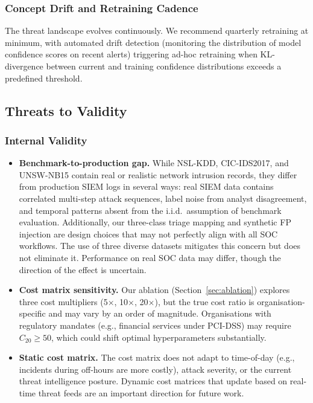 \documentclass[conference]{IEEEtran}
\begin{document}
\subsubsection{Concept Drift and Retraining Cadence}
The threat landscape evolves continuously.
We recommend quarterly retraining at minimum, with automated drift detection
(monitoring the distribution of model confidence scores on recent alerts) triggering
ad-hoc retraining when KL-divergence between current and training confidence distributions
exceeds a predefined threshold.

\subsection{Threats to Validity}
\label{sec:threats}

\subsubsection{Internal Validity}
\begin{itemize}
  \item \textbf{Benchmark-to-production gap.}
    While NSL-KDD, CIC-IDS2017, and UNSW-NB15 contain real or realistic network
    intrusion records, they differ from production SIEM logs in several ways:
    real SIEM data contains correlated multi-step attack sequences, label noise
    from analyst disagreement, and temporal patterns absent from the i.i.d.\
    assumption of benchmark evaluation.
    Additionally, our three-class triage mapping and synthetic FP injection are
    design choices that may not perfectly align with all SOC workflows.
    The use of three diverse datasets mitigates this concern but does not eliminate it.
    Performance on real SOC data may differ, though the direction of the effect is
    uncertain.
  \item \textbf{Cost matrix sensitivity.}
    Our ablation (Section~\ref{sec:ablation}) explores three cost multipliers (5$\times$,
    10$\times$, 20$\times$), but the true cost ratio is organisation-specific and may vary
    by an order of magnitude.
    Organisations with regulatory mandates (e.g., financial services under PCI-DSS) may
    require $C_{20} \geq 50$, which could shift optimal hyperparameters substantially.
  \item \textbf{Static cost matrix.}
    The cost matrix does not adapt to time-of-day (e.g., incidents during off-hours are more
    costly), attack severity, or the current threat intelligence posture.
    Dynamic cost matrices that update based on real-time threat feeds are an important
    direction for future work.
\end{itemize}
\end{document}
